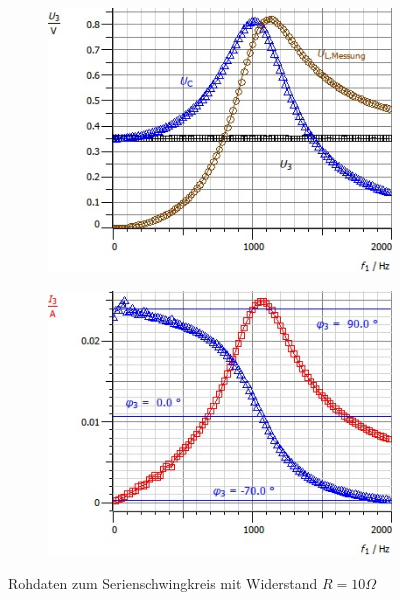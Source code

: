 \documentclass[12pt,a4paper]{article}
\begin{document}
\begin{figure}[H]
	\centering
	\begin{subfigure}{0.49\textwidth}
		\centering
		\includegraphics[width=\textwidth]{Daten/S10Ohm_Rohdaten_U.jpg}
	\end{subfigure}
	\begin{subfigure}{0.49\textwidth}
		\centering
		\includegraphics[width=\textwidth]{Daten/S10Ohm_Rohdaten_I.jpg}
	\end{subfigure}
	\caption{Rohdaten zum Serienschwingkreis mit Widerstand $R=10\Omega$}
	\label{Rohdaten_S10}
\end{figure}
\end{document}
